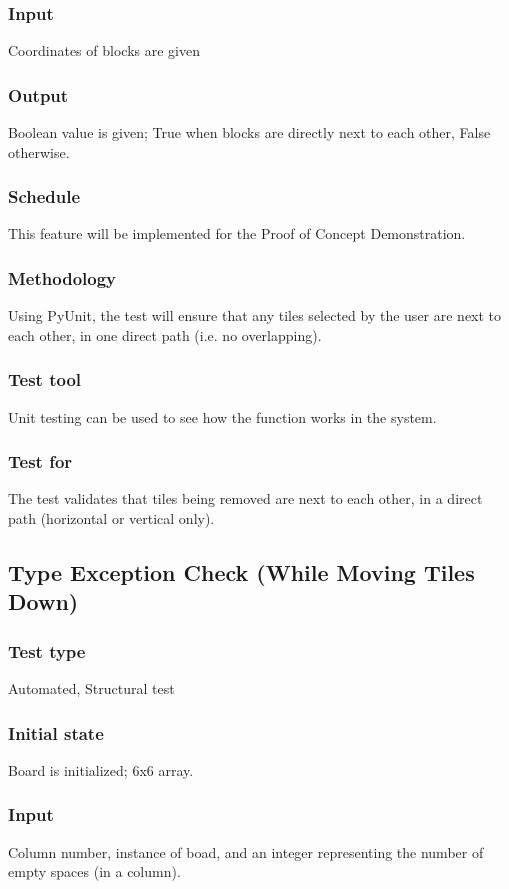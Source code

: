 \documentclass[12pt]{article}
\begin{document}
\subsubsection{Input}
Coordinates of blocks are given
\subsubsection{Output}
Boolean value is given; True when blocks are directly next to each other, False otherwise.
\subsubsection{Schedule}
This feature will be implemented for the Proof of Concept Demonstration.
\subsubsection{Methodology}
Using PyUnit, the test will ensure that any tiles selected by the user are next to each other, in one direct path (i.e. no overlapping).
\subsubsection{Test tool}
Unit testing can be used to see how the function works in the system.
\subsubsection{Test for}
The test validates that tiles being removed are next to each other, in a direct path (horizontal or vertical only).

\newpage

\subsection{Type Exception Check (While Moving Tiles Down)}
\subsubsection{Test type}
Automated, Structural test
\subsubsection{Initial state}
Board is initialized; 6x6 array.
\subsubsection{Input}
Column number, instance of boad, and an integer representing the number of empty spaces (in a column). 
\end{document}
